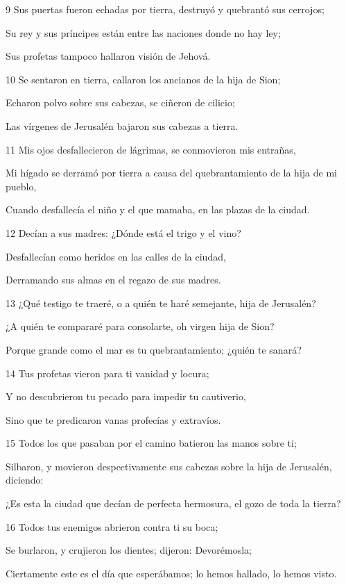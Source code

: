 \par 9 Sus puertas fueron echadas por tierra, destruyó y quebrantó sus cerrojos;
\par Su rey y sus príncipes están entre las naciones donde no hay ley;
\par Sus profetas tampoco hallaron visión de Jehová.
\par 10 Se sentaron en tierra, callaron los ancianos de la hija de Sion;
\par Echaron polvo sobre sus cabezas, se ciñeron de cilicio;
\par Las vírgenes de Jerusalén bajaron sus cabezas a tierra.
\par 11 Mis ojos desfallecieron de lágrimas, se conmovieron mis entrañas,
\par Mi hígado se derramó por tierra a causa del quebrantamiento de la hija de mi pueblo,
\par Cuando desfallecía el niño y el que mamaba, en las plazas de la ciudad.
\par 12 Decían a sus madres: ¿Dónde está el trigo y el vino?
\par Desfallecían como heridos en las calles de la ciudad,
\par Derramando sus almas en el regazo de sus madres.
\par 13 ¿Qué testigo te traeré, o a quién te haré semejante, hija de Jerusalén?
\par ¿A quién te compararé para consolarte, oh virgen hija de Sion?
\par Porque grande como el mar es tu quebrantamiento; ¿quién te sanará?
\par 14 Tus profetas vieron para ti vanidad y locura;
\par Y no descubrieron tu pecado para impedir tu cautiverio,
\par Sino que te predicaron vanas profecías y extravíos.
\par 15 Todos los que pasaban por el camino batieron las manos sobre ti;
\par Silbaron, y movieron despectivamente sus cabezas sobre la hija de Jerusalén, diciendo:
\par ¿Es esta la ciudad que decían de perfecta hermosura, el gozo de toda la tierra?
\par 16 Todos tus enemigos abrieron contra ti su boca;
\par Se burlaron, y crujieron los dientes; dijeron: Devorémosla;
\par Ciertamente este es el día que esperábamos; lo hemos hallado, lo hemos visto.
